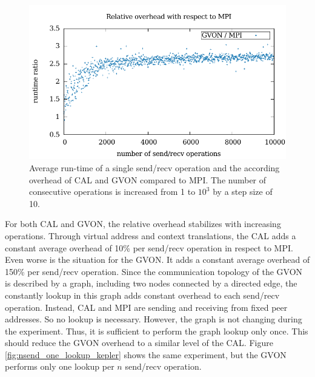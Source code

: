 \begin{figure}[H]
\begin{minipage}[t]{0.5\textwidth}
    \includegraphics[width=\textwidth]{plots/50_nsend_overhead_gvon}
  \end{minipage}%
  \caption{Average run-time of a single send/recv operation and the
    according overhead of CAL and GVON compared to MPI. The number of
    consecutive operations is increased from 1 to $10^3$ by a step
    size of 10. }
  \label{fig:nsend_kepler}
\end{figure}

For both CAL and GVON, the relative overhead stabilizes with
increasing operations.  Through virtual address and context
translations, the CAL adds a constant average overhead of 10\% per
send/recv operation in respect to MPI. Even worse is the situation for
the GVON.  It adds a constant average overhead of 150\% per send/recv
operation.  Since the communication topology of the GVON is described
by a graph, including two nodes connected by a directed edge, the
constantly lookup in this graph adds constant overhead to each
send/recv operation.  Instead, CAL and MPI are sending and receiving
from fixed peer addresses. So no lookup is necessary.  However, the
graph is not changing during the experiment. Thus, it is sufficient to
perform the graph lookup only once. This should reduce the GVON
overhead to a similar level of the CAL. Figure
\ref{fig:nsend_one_lookup_kepler} shows the same experiment, but the
GVON performs only one lookup per $n$ send/recv operation.

